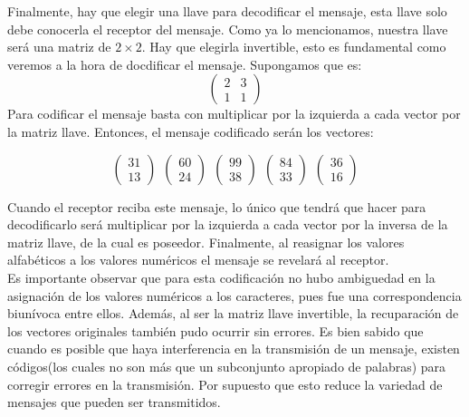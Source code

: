 \documentclass[12pt,a4paper]{article}
\begin{document}
Finalmente, hay que elegir una llave para decodificar el mensaje, esta llave solo debe conocerla el receptor del mensaje. Como ya lo mencionamos, nuestra llave ser\'a una matriz de $2\times 2$. Hay que elegirla invertible, esto es fundamental como veremos a la hora de docdificar el mensaje. Supongamos que es:
$$\left(\begin{array}{cc}2&3\\1&1\end{array}\right)$$
\newpage
Para codificar el mensaje basta con multiplicar por la izquierda a cada vector por la matriz llave. Entonces, el mensaje codificado ser\'an los vectores:

$$\left(\begin{array}{c}31\\13\end{array}\right)~~\left(\begin{array}{c}60\\24\end{array}\right)~~\left(\begin{array}{c}99\\38\end{array}\right)~~\left(\begin{array}{c}84\\33\end{array}\right)~~\left(\begin{array}{c}36\\16\end{array}\right)$$ 


Cuando el receptor reciba este mensaje, lo \'unico que tendr\'a que hacer para decodificarlo ser\'a multiplicar por la izquierda a cada vector por la inversa de la matriz llave, de la cual es poseedor. Finalmente, al reasignar los valores alfab\'eticos a los valores num\'ericos el mensaje se revelar\'a al receptor.\\

Es importante observar que para esta codificaci\'on no hubo ambiguedad en la asignaci\'on de los valores num\'ericos a los caracteres, pues fue una correspondencia biun\'ivoca entre ellos. Adem\'as, al ser la matriz llave invertible, la recuparaci\'on de los vectores originales tambi\'en pudo ocurrir sin errores. Es bien sabido que cuando es posible que haya interferencia en la transmisi\'on de un mensaje, existen c\'odigos(los cuales no son m\'as que un subconjunto apropiado de palabras) para corregir errores en la transmisi\'on. Por supuesto que esto reduce la variedad de mensajes que pueden ser transmitidos.\\
\end{document}
